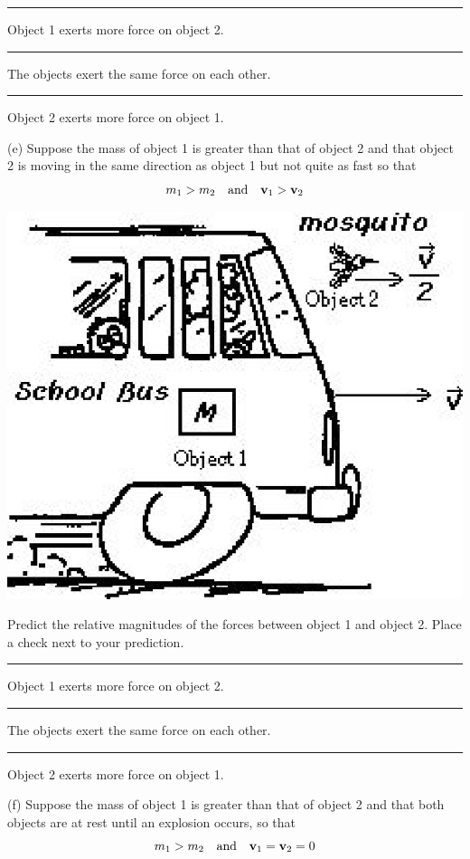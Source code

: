 \rule{0.5in}{0.1pt} Object 1 exerts more force on object 2. 

\rule{0.5in}{0.1pt} The objects exert the same force on each other.

\rule{0.5in}{0.1pt} Object 2 exerts more force on object 1.

(e) Suppose the mass of object 1 is greater than that of object 2 and that object
2 is moving in the same direction as object 1 but not quite as fast so that
\[
m_{1}>m_{2}\quad \mbox{and}\quad {{\bf v}_{1}}>{{\bf v}_{2}}\]


\vspace{0.3cm}
{\par\centering \includegraphics{newtons_laws_fig5.eps} \par}
\vspace{0.3cm}

Predict the relative magnitudes of the forces between object 1 and object 2.
Place a check next to your prediction. 

\rule{0.5in}{0.1pt} Object 1 exerts more force on object 2. 

\rule{0.5in}{0.1pt} The objects exert the same force on each other. 

\rule{0.5in}{0.1pt} Object 2 exerts more force on object 1.

(f) Suppose the mass of object 1 is greater than that of object 2 and that both
objects are at rest until an explosion occurs, so that
\[
m_{1}>m_{2}\quad \mbox{and}\quad {{\bf v}_{1}}={{\bf v}_{2}}=0\]



